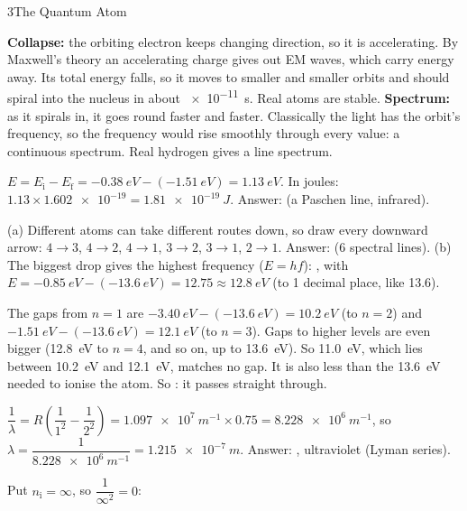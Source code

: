 \begin{chapteranswers}{3}{The Quantum Atom}
  \item \textbf{Collapse:} the orbiting electron keeps changing direction, so it is
        accelerating. By Maxwell's theory an accelerating charge gives out EM waves, which carry
        energy away. Its total energy falls, so it moves to smaller and smaller orbits and should
        spiral into the nucleus in about \qty{e-11}{s}. Real atoms are stable.
        \textbf{Spectrum:} as it spirals in, it goes round faster and faster. Classically the
        light has the orbit's frequency, so the frequency would rise smoothly through every
        value: a continuous spectrum. Real hydrogen gives a line spectrum.
  \item $E = E_\mathrm{i} - E_\mathrm{f} = \qty{-0.38}{eV} - (\qty{-1.51}{eV}) = \qty{1.13}{eV}$.
        In joules: $1.13 \times \num{1.602e-19} = \qty{1.81e-19}{J}$.
        Answer:  (a Paschen line, infrared).
  \item (a) Different atoms can take different routes down, so draw every downward arrow:
        $4\to3$, $4\to2$, $4\to1$, $3\to2$, $3\to1$, $2\to1$.
        Answer:  (6 spectral lines).
        (b) The biggest drop gives the highest frequency ($E = hf$): , with
        $E = \qty{-0.85}{eV} - (\qty{-13.6}{eV}) = 12.75 \approx \qty{12.8}{eV}$ (to 1 decimal
        place, like 13.6).
  \item The gaps from $n = 1$ are $\qty{-3.40}{eV} - (\qty{-13.6}{eV}) = \qty{10.2}{eV}$ (to
        $n = 2$) and $\qty{-1.51}{eV} - (\qty{-13.6}{eV}) = \qty{12.1}{eV}$ (to $n = 3$).
        Gaps to higher levels are even bigger (\qty{12.8}{eV} to $n = 4$, and so on, up to
        \qty{13.6}{eV}). So \qty{11.0}{eV}, which lies between \qty{10.2}{eV} and
        \qty{12.1}{eV}, matches no gap. It is also less than the \qty{13.6}{eV} needed to
        ionise the atom. So : it passes straight through.
  \item $\dfrac{1}{\lambda} = R\left(\dfrac{1}{1^2} - \dfrac{1}{2^2}\right)
        = \qty{1.097e7}{m^{-1}} \times 0.75 = \qty{8.228e6}{m^{-1}}$, so
        $\lambda = \dfrac{1}{\qty{8.228e6}{m^{-1}}} = \qty{1.215e-7}{m}$.
        Answer: , ultraviolet (Lyman series).
  \item Put $n_\mathrm{i} = \infty$, so $\dfrac{1}{\infty^2} = 0$:

\end{chapteranswers}
